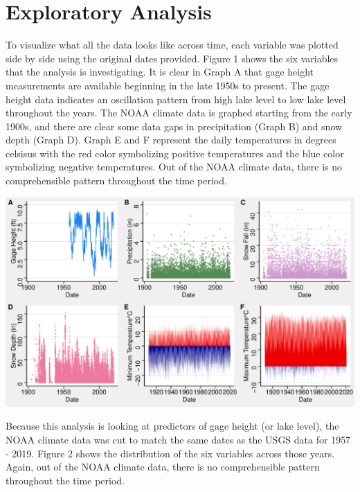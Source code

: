 \documentclass[12pt,]{article}
\let\origfigure\figure
\let\endorigfigure\endfigure
\renewenvironment{figure}[1][2] {
    \expandafter\origfigure\expandafter[H]
} {
    \endorigfigure
}
\begin{document}
\newpage

\hypertarget{exploratory-analysis}{%
\section{Exploratory Analysis}\label{exploratory-analysis}}

To visualize what all the data looks like across time, each variable was
plotted side by side using the original dates provided. Figure 1 shows
the six variables that the analysis is investigating. It is clear in
Graph A that gage height measurements are available beginning in the
late 1950s to present. The gage height data indicates an oscillation
pattern from high lake level to low lake level throughout the years. The
NOAA climate data is graphed starting from the early 1900s, and there
are clear some data gaps in precipitation (Graph B) and snow depth
(Graph D). Graph E and F represent the daily temperatures in degrees
celsisus with the red color symbolizing positive temperatures and the
blue color symbolizing negative temperatures. Out of the NOAA climate
data, there is no comprehensible pattern throughout the time period.

\begin{figure}
\centering
\includegraphics{Shintaku_ENV872_Project_files/figure-latex/unnamed-chunk-3-1.pdf}
\caption{Lake Tahoe Gage Height and Climate Data Time Series 1903-2019}
\end{figure}

Because this analysis is looking at predictors of gage height (or lake
level), the NOAA climate data was cut to match the same dates as the
USGS data for 1957 - 2019. Figure 2 shows the distribution of the six
variables across those years. Again, out of the NOAA climate data, there
is no comprehensible pattern throughout the time period.
\end{document}
